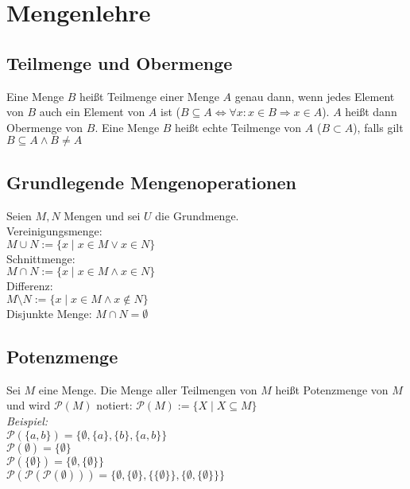 \section{Mengenlehre}
\subsection*{Teilmenge und Obermenge}
Eine Menge $B$ heißt Teilmenge einer Menge $A$ genau dann,
wenn jedes Element von $B$ auch ein Element von $A$ ist ($B\subseteq A\Leftrightarrow\forall x:x\in B\Rightarrow x\in A$).
$A$ heißt dann Obermenge von $B$. Eine Menge $B$ heißt echte Teilmenge von $A$ ($B\subset A$), falls gilt $B\subseteq A\wedge B\neq A$
\subsection*{Grundlegende Mengenoperationen}
Seien $M, N$ Mengen und sei $U$ die Grundmenge.\\
Vereinigungsmenge:\\
$M\cup N:=\{x\mid x\in M\vee x\in N\}$\\
Schnittmenge:\\
$M\cap N:=\{x\mid x\in M\wedge x\in N\}$\\
Differenz:\\
$M\setminus N:=\{x\mid x\in M\wedge x\notin N\}$\\
Disjunkte Menge: $M\cap N=\emptyset$
\subsection*{Potenzmenge}
Sei $M$ eine Menge. Die Menge aller Teilmengen von $M$ heißt Potenzmenge von $M$ und
wird $\mathcal{P}(M)$ notiert: $\mathcal{P}(M):=\{X\mid X\subseteq M\}$\\
\emph{Beispiel:}\\
$\mathcal{P}(\{a,b\})=\{\emptyset,\{a\},\{b\},\{a,b\}\}$\\
$\mathcal{P}(\emptyset)=\{\emptyset\}$\\
$\mathcal{P}(\{\emptyset\})=\{\emptyset,\{\emptyset\}\}$\\
$\mathcal{P}(\mathcal{P}(\mathcal{P}(\emptyset)))=\{\emptyset,\{\emptyset\},\{\{\emptyset\}\},\{\emptyset,\{\emptyset\}\}\}$
